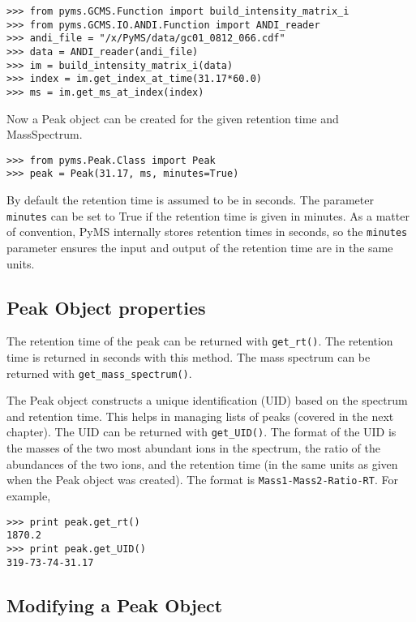 \begin{verbatim}
>>> from pyms.GCMS.Function import build_intensity_matrix_i
>>> from pyms.GCMS.IO.ANDI.Function import ANDI_reader
>>> andi_file = "/x/PyMS/data/gc01_0812_066.cdf"
>>> data = ANDI_reader(andi_file)
>>> im = build_intensity_matrix_i(data)
>>> index = im.get_index_at_time(31.17*60.0)
>>> ms = im.get_ms_at_index(index)
\end{verbatim}

\noindent
Now a Peak object can be created for the given retention time and MassSpectrum.

\begin{verbatim}
>>> from pyms.Peak.Class import Peak
>>> peak = Peak(31.17, ms, minutes=True)
\end{verbatim}

\noindent
By default the retention time is assumed to be in seconds. The parameter
{\tt minutes} can be set to True if the retention time is given in minutes. As a
matter of convention, PyMS internally stores retention times in seconds, so the
{\tt minutes} parameter ensures the input and output of the retention time are
in the same units.

\subsection{Peak Object properties}


The retention time of the peak can be returned with {\tt get\_rt()}. The
retention time is returned in seconds with this method. The mass spectrum
can be returned with {\tt get\_mass\_spectrum()}.

The Peak object constructs a unique identification (UID) based on the spectrum
and retention time. This helps in managing lists of peaks (covered in the next
chapter). The UID can be returned with {\tt get\_UID()}. The format of the UID
is the masses of the two most abundant ions in the spectrum, the ratio of the
abundances of the two ions, and the retention time (in the same units as given
when the Peak object was created). The format is {\tt Mass1-Mass2-Ratio-RT}. For
example,

\begin{verbatim}
>>> print peak.get_rt()
1870.2
>>> print peak.get_UID()
319-73-74-31.17
\end{verbatim}

\subsection{Modifying a Peak Object}

